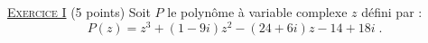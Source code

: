 \providecommand{\Plan}{(\mathscr{P})}
\providecommand{\Ouv}{(O ; \vec{u}, \vec{v})}
\providecommand{\cm}{~\mathrm{cm}}
\providecommand{\Courbe}{(\mathscr{C})}
\providecommand{\CourbeP}{(\mathscr{C}')}
\providecommand{\D}{(\mathscr{D})}
\providecommand{\Droite}{(\mathscr{D})}
\providecommand{\dx}{~\mathrm{d}x}
\providecommand{\Angl}[2]{\left( \overrightarrow{#1} ; \overrightarrow{#2} \right)}
\noindent \underline{\textsc{Exercice I}} (5 points) 
      Soit $P$ le polyn\^ome \`a variable complexe $z$ d\'efini par :
      \[
            P(z) = z^3 + (1 - 9i) z^2 - (24 + 6i) z - 14 + 18 i \;.
      \]
